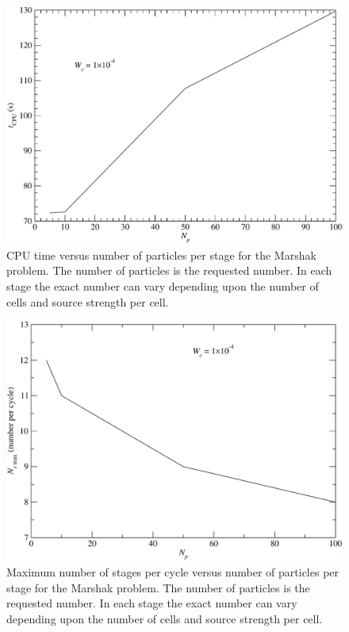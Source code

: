 \documentclass[preprint,12pt]{elsarticle}
\begin{document}
\begin{figure}[htpb!]
  \centerline{
    \includegraphics[width=5in,clip]{mrshk_np_CPU.pdf}}
  \caption{CPU time versus number of particles per stage for the
    Marshak problem.  The number of particles is the requested number.
    In each stage the exact number can vary depending upon the number
    of cells and source strength per cell.}
  \label{fig:CPU_Np}
\end{figure}

\begin{figure}[htpb!]
  \centerline{
    \includegraphics[width=5in,clip]{mrshk_np_Ns.pdf}}
  \caption{
    Maximum number of stages per cycle versus number of particles per
    stage for the Marshak problem.  The number of particles is the
    requested number.  In each stage the exact number can vary
    depending upon the number of cells and source strength per cell.}
  \label{fig:CPU_Ns}
\end{figure}
\end{document}
